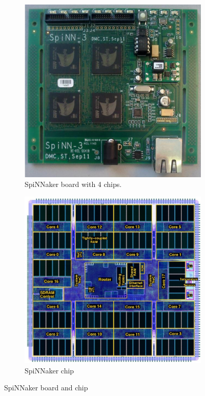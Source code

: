 \begin{figure}[ht]
\centering
\begin{subfigure}{0.45\textwidth}
\includegraphics[width=\textwidth]{images/spinnaker_board.png} 
\caption{SpiNNaker board with 4 chips.}
\label{fig:spinnaker_board}
\end{subfigure}
\begin{subfigure}{0.45\textwidth}
\includegraphics[width=\textwidth]{images/spinnaker_chip.png}
\caption{SpiNNaker chip}
\label{fig:spinnaker_chip}
\end{subfigure}
\caption[SpiNNaker Board and Chip]{SpiNNaker board and chip}
\label{fig:spinnaker}
\end{figure}

